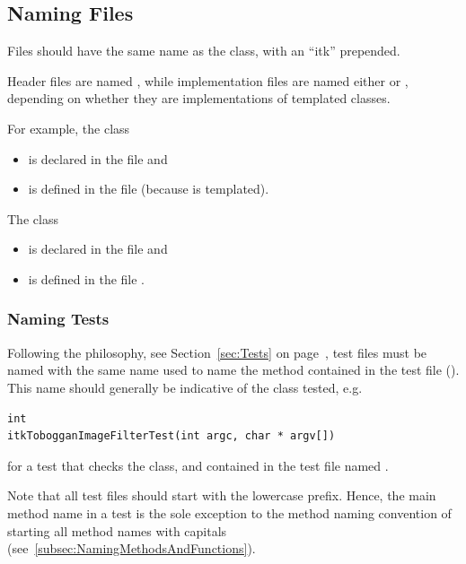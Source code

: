\subsection{Naming Files}%
\label{subsec:NamingFiles}

Files should have the same name as the class, with an ``itk'' prepended.

Header files are named , while implementation files are named either
 or , depending on whether they are implementations of
templated classes.

For example, the class 
\begin{itemize}
\item is declared in the file  and
\item is defined in the file  (because 
is templated).
\end{itemize}

The class 
\begin{itemize}
\item is declared in the file  and
\item is defined in the file .
\end{itemize}


\subsubsection{Naming Tests}%
\label{subsubsec:NamingTests}

Following the  philosophy, see Section~\ref{sec:Tests} on
page~\pageref{sec:Tests}, test files must be named with the same name used to
name the  method contained in the test file (). This
name should generally be indicative of the class tested, e.g.
\small
\begin{verbatim}
int
itkTobogganImageFilterTest(int argc, char * argv[])
\end{verbatim}
\normalsize

for a test that checks the  class, and contained
in the test file named .

Note that all test files should start with the lowercase  prefix.
Hence, the main method name in a test is the sole exception to the method naming
convention of starting all method names with capitals
(see~\ref{subsec:NamingMethodsAndFunctions}).

